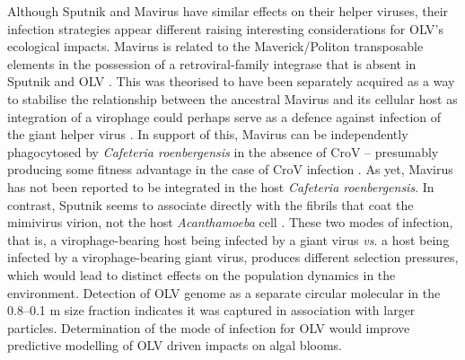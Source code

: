 Although Sputnik and Mavirus have similar effects on their helper viruses, their infection strategies appear different raising interesting considerations for \ac{OLV}'s ecological impacts.
Mavirus is related to the Maverick/Politon transposable elements in the possession of a retroviral-family integrase that is absent in Sputnik and \ac{OLV} \cite{Fischer2011a}.
This was theorised to have been separately acquired as a way to stabilise the relationship between the ancestral Mavirus and its cellular host as integration of a virophage could perhaps serve as a defence against infection of the giant helper virus \cite{Fischer2011a}.
In support of this, Mavirus can be independently phagocytosed by \emph{Cafeteria roenbergensis} in the absence of \ac{CroV} -- presumably producing some fitness advantage in the case of \ac{CroV} infection \cite{Fischer2011a}.
As yet, Mavirus has not been reported to be integrated in the host \emph{Cafeteria roenbergensis}.
In contrast, Sputnik seems to associate directly with the fibrils that coat the mimivirus virion, not the host \emph{Acanthamoeba} cell \cite{Boyer2011}.
These two modes of infection, that is, a virophage-bearing host being infected by a giant virus \emph{vs}. a host being infected by a virophage-bearing giant virus, produces different selection pressures, which would lead to distinct effects on the population dynamics in the environment.
Detection of \ac{OLV} genome as a separate circular molecular in the 0.8--0.1 \textmu{}m size fraction indicates it was captured in association with larger particles.
Determination of the mode of infection for \ac{OLV} would improve predictive modelling of \ac{OLV} driven impacts on algal blooms.

